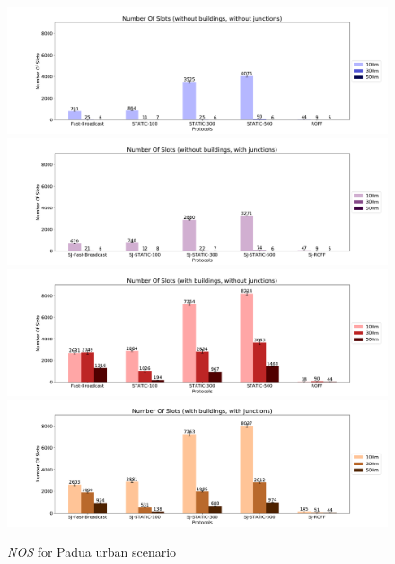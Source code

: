 		\begin{figure}[H]
			\centering
			\includegraphics[width=1.0\textwidth]{immagini/padua-25/b0/j0/nos}
			\includegraphics[width=1.0\textwidth]{immagini/padua-25/b0/j1/nos}
			\includegraphics[width=1.0\textwidth]{immagini/padua-25/b1/j0/nos}
			\includegraphics[width=1.0\textwidth]{immagini/padua-25/b1/j1/nos}
			\caption{\textit{NOS} for Padua urban scenario}
			\label{fig:padua-25-nos}
		\end{figure}
		
